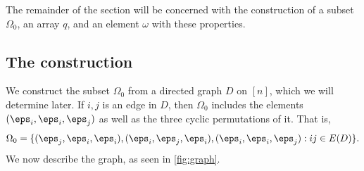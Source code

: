 The remainder of the section will be concerned with the construction of a subset $\Omega_0$, an array $q$, and  an element $\omega$ with these properties.


\subsection{The construction}\label{subsec:diameter-constr}

We construct the subset $\Omega_0$ from a directed graph $D$ on $[n]$, which we will determine later. If $i,j$ is an edge in $D$, then $\Omega_0$ includes the elements $(\eps_i, \eps_i, \eps_j)$ as well as the three cyclic permutations of it. That is, 
$$ \Omega_0 = \{(\eps_j, \eps_i, \eps_i), (\eps_i, \eps_j, \eps_i), (\eps_i, \eps_i, \eps_j): ij \in E(D)\}.$$
We now describe the graph, as seen in \cref{fig:graph}.

